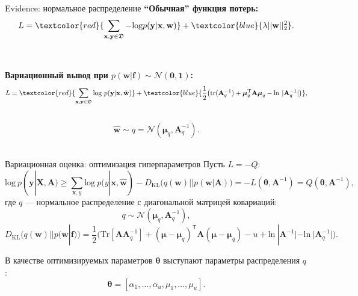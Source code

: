 \documentclass[10pt,pdf,utf8,russian,aspectratio=169]{beamer}
\begin{document}
\begin{frame}{Evidence: нормальное распределение}
\textbf{``Обычная'' функция потерь:}\\
$$
L = \textcolor{red}{\sum_{\mathbf{x}, \mathbf{y} \in \mathfrak{D}} - \text{log}p(\mathbf{y}|\mathbf{x}, \mathbf{w})} + \textcolor{blue}{\lambda||\mathbf{w}||_2^2}.
$$\\~\\

\textbf{Вариационный вывод при $p(\mathbf{w}|\mathbf{f}) \sim \mathcal{N}(\mathbf{0}, \mathbf{1})$:}\\
$$
L =   \textcolor{red}{\sum_{\mathbf{x}, \mathbf{y} \in \mathfrak{D}} \text{log}~p(\mathbf{y}|\mathbf{x}, \hat{\mathbf{w}})} +
 \textcolor{blue}{\frac{1}{2} \bigl( \text{tr} (\mathbf{A}^{-1}_q) + \boldsymbol{\mu}_q^\text{T}\mathbf{A}\boldsymbol{\mu}_q  - \text{ln}~|\mathbf{A}^{-1}_q| \bigr)},
$$\\$$\hat{\mathbf{w}} \sim q = \mathcal{N}(\boldsymbol{\mu}_q, \mathbf{A}^{-1}_q).$$~\\


\end{frame}

\begin{frame}{Вариационная оценка: оптимизация гиперпараметров}
Пусть $L=-Q$:
\[
\label{eq:elbo}
\text{log}~p(\mathbf{y}|\mathbf{X},\mathbf{A})  
\geq 
\sum_{\mathbf{x},y} \text{log}~p({y}|\mathbf{x}, \hat{\mathbf{w}}) - D_\text{KL}\bigl(q (\mathbf{w}) || p (\mathbf{w}|\mathbf{A})\bigr) = -L(\boldsymbol{\theta}, \mathbf{A}^{-1}) = Q(\boldsymbol{\theta}, \mathbf{A}^{-1}),
\]
где $q$ --- нормальное распределение с диагональной матрицей ковариаций:
\[
\label{eq:diag}
	q \sim \mathcal{N}(\boldsymbol{\mu}_q, \mathbf{A}^{-1}_q),
\]
$$
D_\text{KL}\bigl(q (\mathbf{w}) || p (\mathbf{w}|\mathbf{f})\bigr) = \frac{1}{2} \bigl( \text{Tr} [\mathbf{A}\mathbf{A}^{-1}_q] + (\boldsymbol{\mu} - \boldsymbol{\mu}_q)^\mathsf{T}\mathbf{A}(\boldsymbol{\mu} - \boldsymbol{\mu}_q) - u +\text{ln}~|\mathbf{A}^{-1}| - \text{ln}~|\mathbf{A}_q^{-1}| \bigr).
$$

В качестве оптимизируемых параметров $\boldsymbol{\theta}$ выступают параметры распределения $q$:
\[
\boldsymbol{\theta} = [\alpha_1, \dots, \alpha_u, {\mu}_1,\dots,{\mu}_u].
\]


\end{frame}
\end{document}

